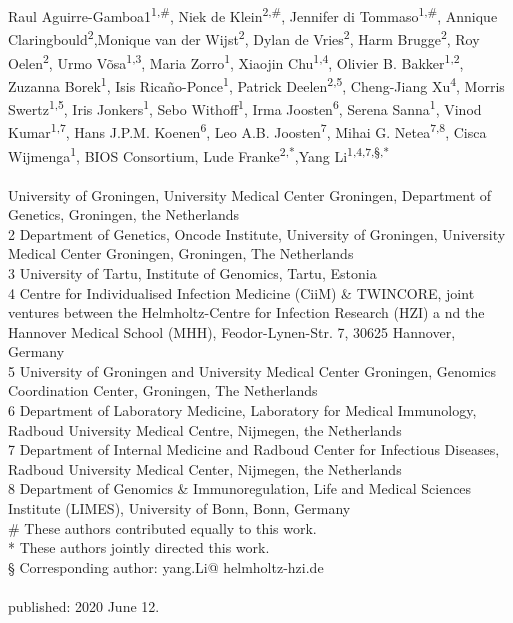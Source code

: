 \noindent
\\
\\
Raul Aguirre-Gamboa1\textsuperscript{1,\#}, Niek de Klein\textsuperscript{2,\#}, Jennifer di Tommaso\textsuperscript{1,\#}, Annique Claringbould\textsuperscript{2},Monique van der Wijst\textsuperscript{2}, Dylan de Vries\textsuperscript{2}, Harm Brugge\textsuperscript{2}, Roy Oelen\textsuperscript{2}, Urmo Võsa\textsuperscript{1,3}, Maria Zorro\textsuperscript{1}, Xiaojin Chu\textsuperscript{1,4}, Olivier B. Bakker\textsuperscript{1,2}, Zuzanna Borek\textsuperscript{1}, Isis Ricaño-Ponce\textsuperscript{1}, Patrick Deelen\textsuperscript{2,5}, Cheng-Jiang Xu\textsuperscript{4}, Morris Swertz\textsuperscript{1,5}, Iris Jonkers\textsuperscript{1}, Sebo Withoff\textsuperscript{1}, Irma Joosten\textsuperscript{6}, Serena Sanna\textsuperscript{1}, Vinod Kumar\textsuperscript{1,7}, Hans J.P.M. Koenen\textsuperscript{6}, Leo A.B. Joosten\textsuperscript{7}, Mihai G. Netea\textsuperscript{7,8}, Cisca Wijmenga\textsuperscript{1}, BIOS Consortium, Lude Franke\textsuperscript{2,*},Yang Li\textsuperscript{1,4,7,§,*}
\\
\\
 University of Groningen, University Medical Center Groningen, Department of Genetics, Groningen, the Netherlands\\
2 Department of Genetics, Oncode Institute, University of Groningen, University Medical Center Groningen, Groningen, The Netherlands\\
3 University of Tartu, Institute of Genomics, Tartu, Estonia\\
4 Centre for Individualised Infection Medicine (CiiM) \& TWINCORE, joint ventures between the Helmholtz-Centre for Infection Research (HZI) a nd the Hannover Medical School (MHH), Feodor-Lynen-Str. 7, 30625 Hannover, Germany\\
5 University of Groningen and University Medical Center Groningen, Genomics Coordination Center, Groningen, The Netherlands\\
6 Department of Laboratory Medicine, Laboratory for Medical Immunology, Radboud University Medical Centre, Nijmegen, the Netherlands\\
7 Department of Internal Medicine and Radboud Center for Infectious Diseases, Radboud University Medical Center, Nijmegen, the Netherlands\\
8 Department of Genomics \& Immunoregulation, Life and Medical Sciences Institute (LIMES), University of Bonn, Bonn, Germany\\
\# These authors contributed equally to this work.\\
* These authors jointly directed this work.\\
§ Corresponding author: yang.Li@ helmholtz-hzi.de
\\
\\
\noindent
published: 2020 June 12.



